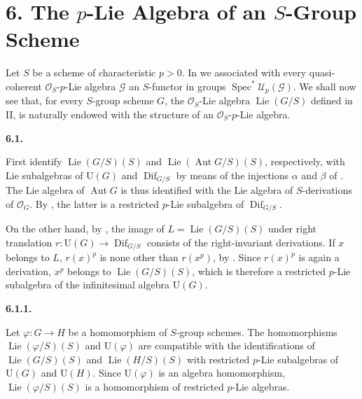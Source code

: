 
\section*{6. The \(p\)-Lie Algebra of an \(S\)-Group Scheme}
\label{sga3:VIIA:6}

Let \(S\) be a scheme of characteristic \(p>0\). In
 we associated with every quasi-coherent
\(\mathcal O_S\)-\(p\)-Lie algebra \(\mathcal G\) an \(S\)-functor in
groups \(\operatorname{Spec}^{*}\mathcal U_p(\mathcal G)\).
We shall now see that, for every \(S\)-group scheme \(G\), the
\(\mathcal O_S\)-Lie algebra \(\operatorname{Lie}(G/S)\) defined
in II,  is naturally endowed with the structure of an
\(\mathcal O_S\)-\(p\)-Lie algebra.

\medskip
\noindent\textbf{6.1.}
\label{sga3:VIIA:6.1}

First identify \(\operatorname{Lie}(G/S)(S)\) and
\(\operatorname{Lie}(\operatorname{Aut}G/S)(S)\), respectively,
with Lie subalgebras of \(\mathrm U(G)\) and
\(\operatorname{Dif}_{G/S}\) by means of the injections
\(\alpha\) and \(\beta\) of . The Lie algebra of
\(\operatorname{Aut}G\) is thus identified with the Lie algebra of
\(S\)-derivations of \(\mathcal O_G\). By , the latter is a
restricted \(p\)-Lie subalgebra of \(\operatorname{Dif}_{G/S}\).

On the other hand, by , the image of
\(L=\operatorname{Lie}(G/S)(S)\) under right translation
\(r:\mathrm U(G)\to\operatorname{Dif}_{G/S}\) consists of the
right-invariant derivations. If \(x\) belongs to \(L\), \(r(x)^p\) is
none other than \(r(x^p)\), by . Since \(r(x)^p\) is again a
derivation, \(x^p\) belongs to \(\operatorname{Lie}(G/S)(S)\), which is
therefore a restricted \(p\)-Lie subalgebra of the infinitesimal algebra
\(\mathrm U(G)\).

\medskip
\noindent\textbf{6.1.1.}
\label{sga3:VIIA:6.1.1}

Let \(\varphi:G\to H\) be a homomorphism of \(S\)-group schemes.
The homomorphisms
\(\operatorname{Lie}(\varphi/S)(S)\) and \(\mathrm U(\varphi)\)
are compatible with the identifications of
\(\operatorname{Lie}(G/S)(S)\) and
\(\operatorname{Lie}(H/S)(S)\) with restricted \(p\)-Lie
subalgebras of \(\mathrm U(G)\) and \(\mathrm U(H)\). Since
\(\mathrm U(\varphi)\) is an algebra homomorphism,
\(\operatorname{Lie}(\varphi/S)(S)\) is a homomorphism of
restricted \(p\)-Lie algebras.

